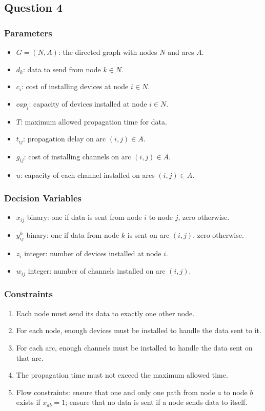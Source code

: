 \subsection*{Question 4}

\subsubsection*{Parameters}

\begin{itemize}
	\item $G = (N, A)$: the directed graph with nodes $N$ and arcs $A$.
	\item $d_k$: data to send from node $k \in N$.
	\item $c_i$: cost of installing devices at node $i \in N$.
	\item $cap_i$: capacity of devices installed at node $i \in N$.
	\item $T$: maximum allowed propagation time for data.
	\item $t_{ij}$: propagation delay on arc $(i, j) \in A$.
	\item $g_{ij}$: cost of installing channels on arc $(i, j) \in A$.
	\item $u$: capacity of each channel installed on arcs $(i, j) \in A$.
\end{itemize}

\subsubsection*{Decision Variables}

\begin{itemize}
	\item $x_{ij}$ binary: one if data is sent from node $i$ to node $j$, zero otherwise.
	\item $y_{ij}^k$ binary: one if data from node $k$ is sent on arc $(i, j)$, zero otherwise.
	\item $z_i$ integer: number of devices installed at node $i$.
	\item $w_{ij}$ integer: number of channels installed on arc $(i, j)$.
\end{itemize}

\subsubsection*{Constraints}

\begin{enumerate}
	\item Each node must send its data to exactly one other node.
	\item For each node, enough devices must be installed to handle the data sent to it.
	\item For each arc, enough channels must be installed to handle the data sent on that arc.
	\item The propagation time must not exceed the maximum allowed time.
	\item Flow constraints: ensure that one and only one path from node $a$ to node $b$ exists if $x_{ab} = 1$; ensure that no data is sent if a node sends data to itself.
\end{enumerate}

